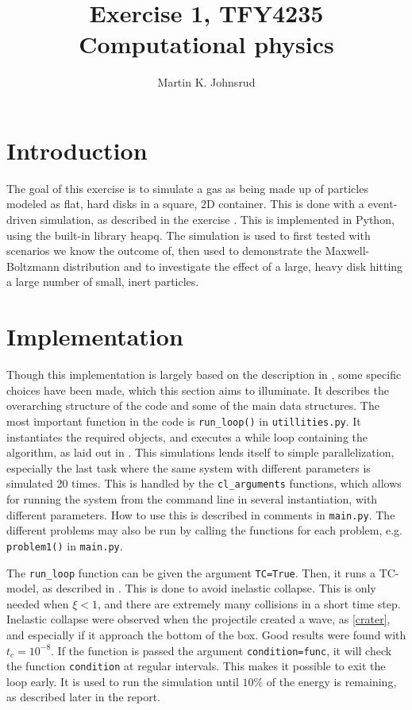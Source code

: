 \documentclass{article}
\title{Exercise 1, TFY4235 Computational physics}
\author{Martin K. Johnsrud}
\date{}
\begin{document}
    \maketitle
    \section*{Introduction}
    The goal of this exercise is to simulate a gas as being made up of particles modeled as flat, hard disks in a square, 2D container.
    This is done with a event-driven simulation, as described in the exercise \cite{exercise}.
    This is implemented in Python, using the built-in library heapq.
    The simulation is used to first tested with scenarios we know the outcome of, then used to demonstrate the Maxwell-Boltzmann distribution and to investigate the effect of a large, heavy disk hitting a large number of small, inert particles.

    \section*{Implementation}
    Though this implementation is largely based on the description in \cite{exercise}, some specific choices have been made, which this section aims to illuminate.
    It describes the overarching structure of the code and some of the main data structures.
    The most important function in the code is \verb|run_loop()| in \verb|utillities.py|.
    It instantiates the required objects, and executes a while loop containing the algorithm, as laid out in \cite{exercise}.
    This simulations lends itself to simple parallelization, especially the last task where the same system with different parameters is simulated 20 times.
    This is handled by the \verb|cl_arguments| functions, which allows for running the system from the command line in several instantiation, with different parameters. 
    How to use this is described in comments in \verb|main.py|.
    The different problems may also be run by calling the functions for each problem, e.g. \verb|problem1()| in \verb|main.py|.
    
    The \verb|run_loop| function can be given the argument \verb|TC=True|.
    Then, it runs a TC-model, as described in \cite{TC}.
    This is done to avoid inelastic collapse.
    This is only needed when $\xi<1$, and there are extremely many collisions in a short time step.
    Inelastic collapse were observed when the projectile created a wave, as \autoref{crater}, and especially if it approach the bottom of the box.
    Good results were found with $t_c = 10^{-8}$.
    If the function is passed the argument \verb|condition=func|, it will check the function \verb|condition| at regular intervals.
    This makes it possible to exit the loop early.
    It is used to run the simulation until $10\%$ of the energy is remaining, as described later in the report.
\end{document}
